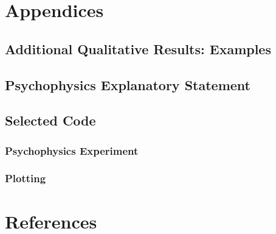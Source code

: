 \documentclass[a4paper,11pt,openany]{book}
\begin{document}
\begin{appendices}
\part{Appendices}
\label{sec:org1ba2208}
\chapter{Additional Qualitative Results: Examples}
\label{sec:org2107f69}
\chapter{Psychophysics Explanatory Statement}
\label{sec:orgfb36cef}
\chapter{Selected Code}
\label{sec:org7fd5dd3}
\section*{Psychophysics Experiment}
\label{sec:orgbba68cf}
\section*{Plotting}
\label{sec:orged761fc}
\clearpage
\part{References}
\label{sec:orgf74fed5}


\end{appendices}
\end{document}
